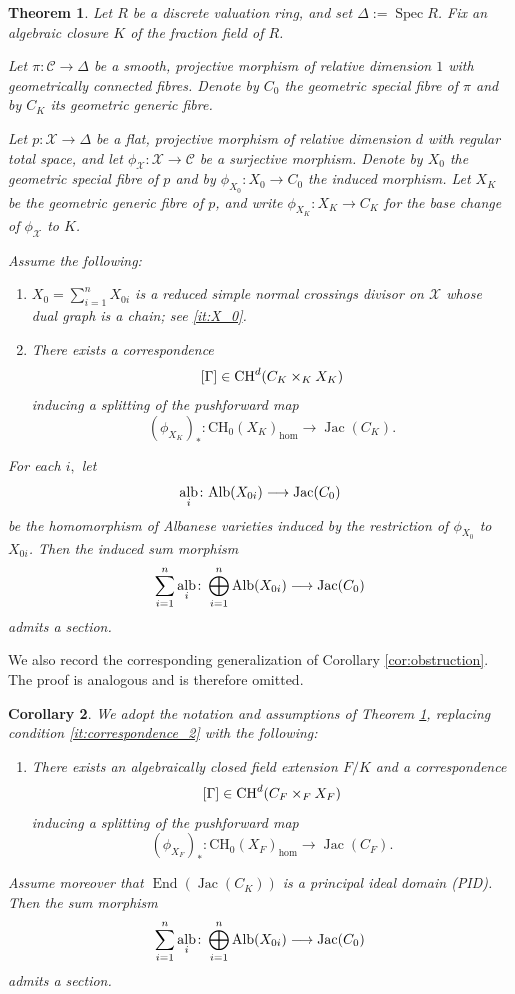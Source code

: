 \documentclass[11pt,letterpaper]{amsart}
\newcommand{\Alb}{\textnormal{Alb}}
\newcommand{\CH}{\textnormal{CH}}
\newcommand{\ca}[1]{{\mathcal{#1}}}
\numberwithin{equation}{section}
\newtheorem{theorem}{Theorem}[section]
\newtheorem{corollary}[theorem]{Corollary}
\theoremstyle{definition}
\theoremstyle{remark}
\DeclareMathOperator{\al}{alb}
\newcommand{\Ch}{\operatorname{CH_{0}}}
\DeclareMathOperator{\End}{End}
\DeclareMathOperator{\Spec}{Spec}
\DeclareMathOperator{\jac}{Jac}
\begin{document}
\begin{theorem}\label{thm:obstruction'}
Let $R$ be a discrete valuation ring, and set $\Delta := \Spec R$. Fix an algebraic closure $K$ of the fraction field of $R$.


    Let $\pi\colon \ca C\to\Delta$ be a smooth, projective morphism of relative dimension $1$ with geometrically connected fibres. Denote by $C_0$ the geometric special fibre of $\pi$ and by $C_K$ its geometric generic fibre.

Let $p \colon \mathcal{X} \to \Delta$ be a flat, projective morphism of relative dimension $d$ with regular total space, and let $\phi_{\mathcal{X}} \colon \mathcal{X} \to \ca C $ be a surjective morphism.
Denote by $X_0$ the geometric special fibre of $p$ and by
$\phi_{X_0} \colon X_0 \to C_0$ the induced morphism. Let $X_{K
}$ be the geometric generic fibre of $p$, and write $\phi_{X_K} \colon X_K \to C_K$
for the base change of $\phi_{\mathcal{X}}$ to $K$.\par
Assume the following:
\begin{enumerate}
    \item \label{it:X_0'} $X_{0}=\sum_{i=1}^{n}X_{0i}$ is a reduced simple normal crossings divisor on $\mathcal{X}$ whose dual graph is a chain; see \eqref{it:X_0}.
    \item \label{it:correspondence_2} 
    There exists a correspondence
$$
[\Gamma] \in \CH^{d}(C_K \times_K X_{K})
$$
inducing a splitting of the pushforward map
$$
(\phi_{X_K})_\ast\colon \Ch(X_{K})_{\hom}\longrightarrow\jac(C_{K}).
$$
    
\end{enumerate}
\par 
For each $i,$ let $$\al_{i}\colon\Alb(X_{0i})\longrightarrow \jac(C_0)$$ be the homomorphism of Albanese varieties induced by the restriction of $\phi_{X_0}$ to $X_{0i}$. Then the induced sum morphism $$\sum_{i=1}^{n}\al_{i}\colon\bigoplus_{i=1}^{n}\Alb(X_{0i})\longrightarrow\jac(C_0)$$
admits a section. 
\end{theorem}

We also record the corresponding generalization of Corollary \ref{cor:obstruction}. The proof is analogous and is therefore omitted.

\begin{corollary}\label{cor:obstruction'}
We adopt the notation and assumptions of Theorem \ref{thm:obstruction'}, replacing condition \eqref{it:correspondence_2} with the following:
\begin{enumerate}
    \item[\((2')\)]\label{it:correspondence-prime_2} There exists an algebraically closed field extension $F/K$ and a correspondence
$$
[\Gamma] \in \CH^{d}(C_F \times_F X_{F})
$$
inducing a splitting of the pushforward map
$$
(\phi_{X_F})_\ast\colon \Ch(X_{F})_{\hom}\longrightarrow\jac(C_{F}).
$$
\end{enumerate}
Assume moreover that $\End(\jac(C_K))$ is a principal ideal domain (PID). Then the sum morphism $$\sum_{i=1}^{n}\al_{i}\colon\bigoplus_{i=1}^{n}\Alb(X_{0i})\longrightarrow\jac(C_0)$$
admits a section. 
\end{corollary}
\end{document}
